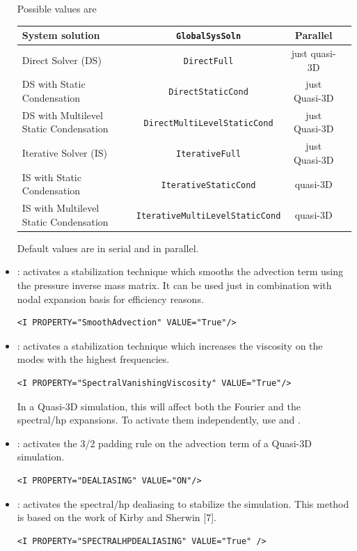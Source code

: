 \begin{itemize}
Possible values are
\begin{center}
\footnotesize
\begin{tabular}{lccc}
\toprule
{System solution} & \texttt{GlobalSysSoln} &{Parallel}\\
\midrule
Direct Solver (DS) & \texttt{DirectFull} & just quasi-3D \\
DS with Static Condensation  & \texttt{DirectStaticCond} & just Quasi-3D \\
DS with Multilevel Static Condensation & \texttt{DirectMultiLevelStaticCond} & just Quasi-3D \\
 Iterative Solver (IS) & \texttt{IterativeFull} & just Quasi-3D \\
IS with Static Condensation  & \texttt{IterativeStaticCond} & quasi-3D \\
IS with Multilevel Static Condensation & \texttt{IterativeMultiLevelStaticCond} & quasi-3D \\
\bottomrule
\end{tabular}
\end{center}

Default values are  in serial and
 in parallel.

\item {}: activates a stabilization technique which smooths
the advection term using the pressure inverse mass matrix. It can be used just in combination with nodal expansion basis for efficiency reasons.

\begin{lstlisting}[style=XMLStyle]
<I PROPERTY="SmoothAdvection" VALUE="True"/>
\end{lstlisting}


\item {}: activates a stabilization technique
which increases the viscosity on the modes with the highest frequencies.
\begin{lstlisting}[style=XMLStyle]
<I PROPERTY="SpectralVanishingViscosity" VALUE="True"/>
\end{lstlisting}

In a Quasi-3D simulation, this will affect both the Fourier and the spectral/hp expansions.
To activate them independently, use  
and .

\item {}: activates the 3/2 padding rule on the advection term
of a Quasi-3D simulation.
\begin{lstlisting}[style=XMLStyle]
<I PROPERTY="DEALIASING" VALUE="ON"/>
\end{lstlisting}


\item {}: activates the spectral/hp dealiasing to
stabilize the simulation. This method is based on the work of Kirby and Sherwin [7].
\begin{lstlisting}[style=XMLStyle]
<I PROPERTY="SPECTRALHPDEALIASING" VALUE="True" />
\end{lstlisting}

\end{itemize}



